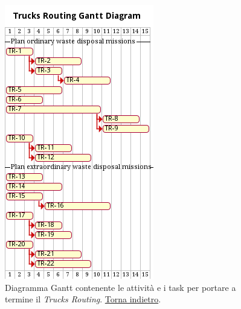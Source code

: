 \begin{figure}[H]
    \centering
    \includegraphics[width=\textwidth]{img/gantt-trucks-routing.pm}
    \caption{Diagramma Gantt contenente le attività e i task per portare a termine il \textit{Trucks Routing}. \hyperlink{back:gantt-trucks-routing}{Torna indietro}.}
    \label{fig:gantt-trucks-routing}
\end{figure}

